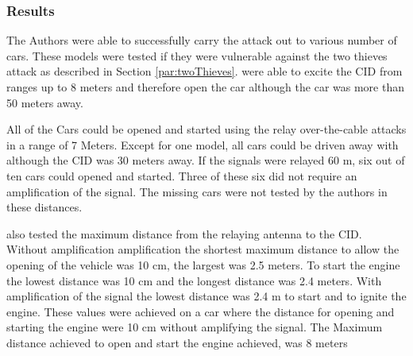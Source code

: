 \subsubsection*{Results}
	The Authors were able to successfully carry the attack out to various number of cars.
	These models were tested if they were vulnerable against the two thieves attack as described in 
	Section \ref{par:twoThieves}.
	\citeauthor{relayAttacksFranc} were able to excite the CID from ranges up to 8 meters
	and therefore open the car although the car was more than 50 meters away.

	All of the Cars could be opened and started using the relay over-the-cable attacks in a range of 7 Meters.
	Except for one model,
	all cars could be driven away with although the CID was 30 meters away.
	If the signals were relayed 60 m,
	six out of ten cars could opened and started.
	Three of these six did not require an amplification of the signal.
	The missing cars were not tested by the authors in these distances.

	\citeauthor{relayAttacksFranc} also tested the maximum distance from the relaying antenna to the CID.
	Without amplification amplification the shortest maximum distance to allow the opening of the vehicle was 10 cm,
	the largest was 2.5 meters.
	To start the engine the lowest distance was 10 cm and the longest distance was 2.4 meters.
	With amplification of the signal the lowest distance was 2.4 m to start and to ignite the engine.
	These values were achieved on a car where the distance for opening and starting the engine were 10 cm
	without amplifying the signal.
	The Maximum distance achieved to open and start the engine achieved,
	was 8 meters
	
